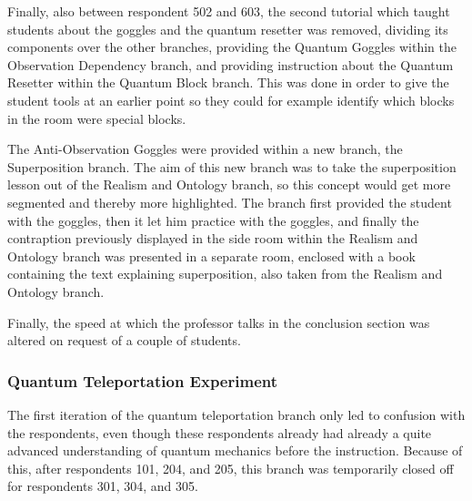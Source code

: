 \documentclass[11pt,twoside]{report} %
\begin{document}
Finally, also between respondent 502 and 603, the second tutorial which taught students about the goggles and the quantum resetter was removed, dividing its components over the other branches, providing the Quantum Goggles within the Observation Dependency branch, and providing instruction about the Quantum Resetter within the Quantum Block branch. This was done in order to give the student  tools at an earlier point so they could for example identify which blocks in the room were special blocks.

The Anti-Observation Goggles were provided within a new branch, the Superposition branch. The aim of this new branch was to take the superposition lesson out of the Realism and Ontology branch, so this concept would get more segmented and thereby more highlighted. The branch first provided the student with the goggles, then it let him practice with the goggles, and finally the contraption previously displayed in the side room within the Realism and Ontology branch was presented in a separate room, enclosed with a book containing the text explaining superposition, also taken from the Realism and Ontology branch.

Finally, the speed at which the professor talks in the conclusion section was altered on request of a couple of students.

\subsubsection{Quantum Teleportation Experiment}

The first iteration of the quantum teleportation branch only led to confusion with the respondents, even though these respondents already had already a quite advanced understanding of quantum mechanics before the instruction. Because of this, after respondents 101, 204, and 205, this branch was temporarily closed off for respondents 301, 304, and 305.
\end{document}
